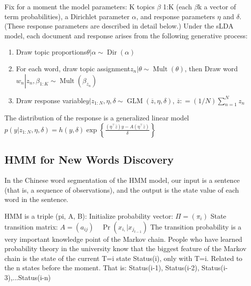\documentclass{acmtog} %
\begin{document}
Fix for a moment the model parameters: K topics $\beta$ 1:K (each $\beta$k a vector of term probabilities), a Dirichlet parameter $\alpha$, and response parameters $\eta$ and $\delta$. (These response parameters are described in detail below.) Under the sLDA model, each document and response arises from the following generative process:

\begin{enumerate}
    \item Draw topic proportions$\theta | \alpha \sim \operatorname { Dir } ( \alpha )$
    \item For each word, draw topic assignment$z _ { n } | \theta \sim \operatorname { Mult } ( \theta )$, then Draw word$w _ { n } \left| z _ { n } , \beta _ { 1 : K } \sim \operatorname { Mult } \left( \beta _ { z _ { n } } \right)\right.$
    \item Draw response variable$y \left| z _ { 1 : N } , \eta , \delta \sim \operatorname { GLM } ( \overline { z } , \eta , \delta )\right.$, $\overline { z } : = ( 1 / N ) \sum _ { n = 1 } ^ { N } z _ { n }$
\end{enumerate}

The distribution of the response is a generalized linear model
$p ( y | z _ { 1 : N } , \eta , \delta ) = h ( y , \delta ) \exp \left\{ \frac { \left( \eta ^ { \top } \overline { z } \right) y - A \left( \eta ^ { \top } \overline { z } \right) } { \delta } \right\}$


\subsection{HMM for New Words Discovery}
In the Chinese word segmentation of the HMM model, our input is a sentence (that is, a sequence of observations), and the output is the state value of each word in the sentence. 

HMM is a triple (pi, A, B):
Initialize probability vector:  $\Pi = \left( \pi _ { i } \right)$ 
State transition matrix:  $A = \left( a _ { i j } \right) \quad \operatorname { Pr } \left( x _ { i , } | x _ { j _ { t - 1 } } \right)$
The transition probability is a very important knowledge point of the Markov chain. People who have learned probability theory in the university know that the biggest feature of the Markov chain is the state of the current T=i state Status(i), only with T=i. Related to the n states before the moment. That is: {Status(i-1), Status(i-2), Status(i-3),...Status(i-n)}
\end{document}
